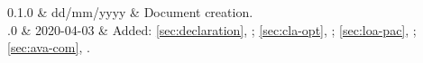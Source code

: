 \begin{chnglog}[semantic]
	0.1.0 & dd/mm/yyyy & Document creation.\\
	.0 & 2020-04-03 &
		Added:
		\cref{sec:declaration}, ;
		\cref{sec:cla-opt}, ;
		\cref{sec:loa-pac}, ;
		\cref{sec:ava-com}, .\\
\end{chnglog}
